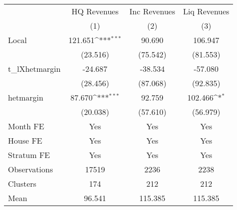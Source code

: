 {
\def\sym#1{\ifmmode^{#1}\else\(^{#1}\)\fi}
\begin{tabular}{l*{3}{c}}
\hline\hline
                &\multicolumn{1}{c}{HQ Revenues}&\multicolumn{1}{c}{Inc Revenues}&\multicolumn{1}{c}{Liq Revenues}\\
                &\multicolumn{1}{c}{(1)}         &\multicolumn{1}{c}{(2)}         &\multicolumn{1}{c}{(3)}         \\
\hline
Local           &  121.651\sym{***}&   90.690         &  106.947         \\
                & (23.516)         & (75.542)         & (81.553)         \\
t\_lXhetmargin   &  -24.687         &  -38.534         &  -57.080         \\
                & (28.456)         & (87.068)         & (92.835)         \\
hetmargin       &   87.670\sym{***}&   92.759         &  102.466\sym{*}  \\
                & (20.038)         & (57.610)         & (56.979)         \\
Month FE        &      Yes         &      Yes         &      Yes         \\
House FE        &      Yes         &      Yes         &      Yes         \\
Stratum FE      &      Yes         &      Yes         &      Yes         \\
\hline
Observations    &    17519         &     2236         &     2238         \\
Clusters        &      174         &      212         &      212         \\
Mean            &   96.541         &  115.385         &  115.385         \\
\hline\hline
\end{tabular}
}

